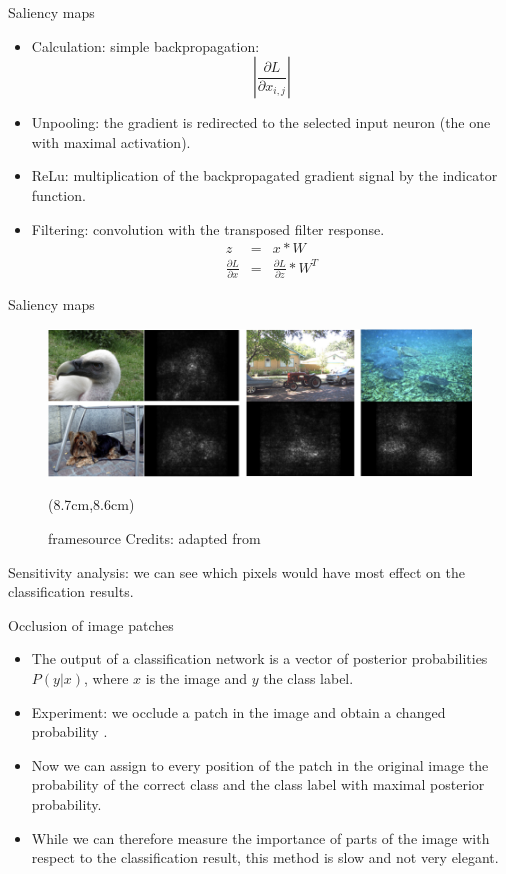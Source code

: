 \documentclass[xcolor=pdftex,dvipsnames,table]{beamer}
\newcommand{\source}[1]{\begin{textblock*}{4cm}(8.7cm,8.6cm)
    \begin{beamercolorbox}[ht=0.5cm,right]{framesource}
      \usebeamerfont{framesource}\usebeamercolor[fg]{framesource} Credits: {#1}
    \end{beamercolorbox}
\end{textblock*}}
\begin{document}
\begin{frame}{Saliency maps}
\begin{itemize}
	\item Calculation: simple backpropagation:
	\begin{equation}
		\left|\frac{\partial L}{\partial x_{i,j}}\right|
	\end{equation} 
	\item Unpooling: the gradient is redirected to the selected input neuron (the one with maximal activation).
	\item ReLu: multiplication of the backpropagated gradient signal by the indicator function.
	\item Filtering: convolution with the transposed filter response.
	\begin{eqnarray}
		z &=& x \ast W \nonumber \\
		\frac{\partial L}{\partial x} &=& \frac{\partial L}{\partial z} \ast W^T 
	\end{eqnarray}
\end{itemize}
\end{frame}

\begin{frame}{Saliency maps}
\begin{figure}[htb]
  \centering
  \includegraphics[width=\textwidth]{../graphics/Vis_saliency_maps.png}
  \source{adapted from \cite{Simonyan:2013}}
\end{figure}
Sensitivity analysis: we can see which pixels would have most effect on the classification results. 
\end{frame}

\begin{frame}{Occlusion of image patches}
	\begin{itemize}
		\item The output of a classification network is a vector of posterior probabilities $P(y|x)$, where $x$ is the image and $y$ the class label. 
		\item Experiment: we occlude a patch in the image and obtain a changed probability \cite{Zeiler:2013}. 
		\item Now we can assign to every position of the patch in the original image the probability of the correct class and the class label with maximal posterior probability. 
		\item While we can therefore measure the importance of parts of the image with respect to the classification result, this method is slow and not very elegant. 
	\end{itemize}
\end{frame}
\end{document}
